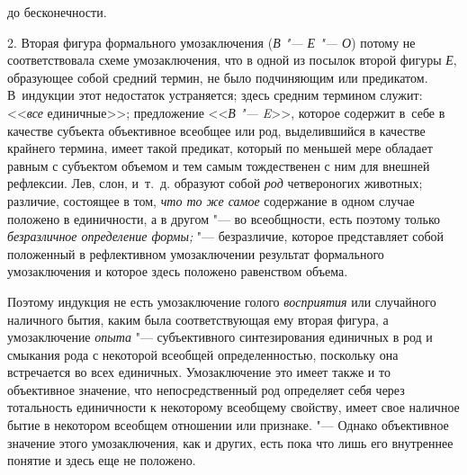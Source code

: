 {\centering
до бесконечности.
\par}

2. Вторая фигура формального умозаключения
({\em В "--- Е "--- О}) потому не соответствовала схеме
умозаключения, что в одной из посылок второй фигуры
{\em Е}, образующее собой
средний термин, не было подчиняющим или предикатом. В~индукции этот
недостаток устраняется; здесь средним термином служит:
<<{\em все} единичные>>;
предложение <<{\em В
"--- E}>>,
которое содержит в~себе в качестве субъекта объективное
всеобщее или род, выделившийся в качестве крайнего термина, имеет такой
предикат, который по меньшей мере обладает равным с субъектом объемом и тем
самым тождественен с ним для внешней рефлексии. Лев, слон, и~т.~д. образуют
собой {\em род} четвероногих животных; различие, состоящее в том,
{\em что то же самое} содержание в одном случае положено в единичности,
а в другом "--- во всеобщности, есть поэтому только
{\em безразличное определение формы;}
"--- безразличие, которое представляет собой положенный в
рефлективном умозаключении результат формального умозаключения и которое
здесь положено равенством объема.

Поэтому индукция не есть умозаключение голого
{\em восприятия} или
случайного наличного бытия, каким была соответствующая ему вторая фигура, а
умозаключение {\em опыта}
"--- субъективного синтезирования единичных в род и смыкания
рода с некоторой всеобщей определенностью, поскольку она встречается во
всех единичных. Умозаключение это имеет также и то объективное значение,
что непосредственный род определяет себя через тотальность единичности к
некоторому всеобщему свойству, имеет свое наличное бытие в некотором
всеобщем отношении или признаке. "--- Однако объективное
значение этого умозаключения, как и других, есть пока что лишь его
внутреннее понятие и здесь еще не положено.

